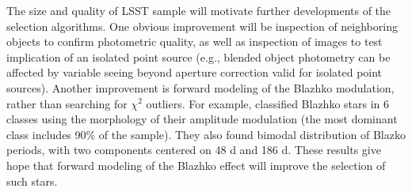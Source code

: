 The size and quality of LSST sample will motivate further developments of the selection algorithms. 
One obvious improvement will be inspection of neighboring objects to confirm photometric quality,
as well as inspection of images to test implication of an isolated point source (e.g., blended object photometry
can be affected by variable seeing beyond aperture correction valid for isolated point sources). 
Another improvement is forward modeling of the Blazhko modulation, rather than searching for $\chi^2$
outliers. For example, \citep{2020MNRAS.494.1237S} classified Blazhko stars in 6 classes using the morphology
of their amplitude modulation (the most dominant class includes 90\% of the sample). They also found bimodal distribution
of Blazko periods, with two components centered on 48 d and 186 d. These results give hope that forward
modeling of the Blazhko effect will improve the selection of such stars.
 


